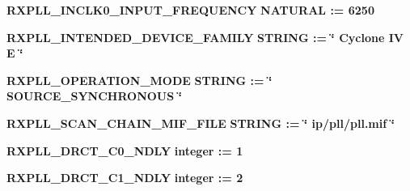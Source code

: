 \begin{DoxyCompactItemize}
\item 
{\bf R\+X\+P\+L\+L\+\_\+\+I\+N\+C\+L\+K0\+\_\+\+I\+N\+P\+U\+T\+\_\+\+F\+R\+E\+Q\+U\+E\+N\+CY} {\bfseries {\bfseries \textcolor{comment}{N\+A\+T\+U\+R\+AL}\textcolor{vhdlchar}{ }\textcolor{vhdlchar}{ }\textcolor{vhdlchar}{\+:}\textcolor{vhdlchar}{=}\textcolor{vhdlchar}{ }\textcolor{vhdlchar}{ } \textcolor{vhdldigit}{6250} \textcolor{vhdlchar}{ }}}
\item 
{\bf R\+X\+P\+L\+L\+\_\+\+I\+N\+T\+E\+N\+D\+E\+D\+\_\+\+D\+E\+V\+I\+C\+E\+\_\+\+F\+A\+M\+I\+LY} {\bfseries {\bfseries \textcolor{comment}{S\+T\+R\+I\+NG}\textcolor{vhdlchar}{ }\textcolor{vhdlchar}{ }\textcolor{vhdlchar}{\+:}\textcolor{vhdlchar}{=}\textcolor{vhdlchar}{ }\textcolor{vhdlchar}{ }\textcolor{vhdlchar}{ }\textcolor{vhdlchar}{ }\textcolor{keyword}{\char`\"{} Cyclone I\+V E \char`\"{}}\textcolor{vhdlchar}{ }}}
\item 
{\bf R\+X\+P\+L\+L\+\_\+\+O\+P\+E\+R\+A\+T\+I\+O\+N\+\_\+\+M\+O\+DE} {\bfseries {\bfseries \textcolor{comment}{S\+T\+R\+I\+NG}\textcolor{vhdlchar}{ }\textcolor{vhdlchar}{ }\textcolor{vhdlchar}{\+:}\textcolor{vhdlchar}{=}\textcolor{vhdlchar}{ }\textcolor{vhdlchar}{ }\textcolor{vhdlchar}{ }\textcolor{vhdlchar}{ }\textcolor{keyword}{\char`\"{} S\+O\+U\+R\+C\+E\+\_\+\+S\+Y\+N\+C\+H\+R\+O\+N\+O\+U\+S \char`\"{}}\textcolor{vhdlchar}{ }}}
\item 
{\bf R\+X\+P\+L\+L\+\_\+\+S\+C\+A\+N\+\_\+\+C\+H\+A\+I\+N\+\_\+\+M\+I\+F\+\_\+\+F\+I\+LE} {\bfseries {\bfseries \textcolor{comment}{S\+T\+R\+I\+NG}\textcolor{vhdlchar}{ }\textcolor{vhdlchar}{ }\textcolor{vhdlchar}{\+:}\textcolor{vhdlchar}{=}\textcolor{vhdlchar}{ }\textcolor{vhdlchar}{ }\textcolor{vhdlchar}{ }\textcolor{vhdlchar}{ }\textcolor{keyword}{\char`\"{} ip/pll/pll.\+mif \char`\"{}}\textcolor{vhdlchar}{ }}}
\item 
{\bf R\+X\+P\+L\+L\+\_\+\+D\+R\+C\+T\+\_\+\+C0\+\_\+\+N\+D\+LY} {\bfseries {\bfseries \textcolor{comment}{integer}\textcolor{vhdlchar}{ }\textcolor{vhdlchar}{ }\textcolor{vhdlchar}{\+:}\textcolor{vhdlchar}{=}\textcolor{vhdlchar}{ }\textcolor{vhdlchar}{ } \textcolor{vhdldigit}{1} \textcolor{vhdlchar}{ }}}
\item 
{\bf R\+X\+P\+L\+L\+\_\+\+D\+R\+C\+T\+\_\+\+C1\+\_\+\+N\+D\+LY} {\bfseries {\bfseries \textcolor{comment}{integer}\textcolor{vhdlchar}{ }\textcolor{vhdlchar}{ }\textcolor{vhdlchar}{\+:}\textcolor{vhdlchar}{=}\textcolor{vhdlchar}{ }\textcolor{vhdlchar}{ } \textcolor{vhdldigit}{2} \textcolor{vhdlchar}{ }}}
\end{DoxyCompactItemize}
